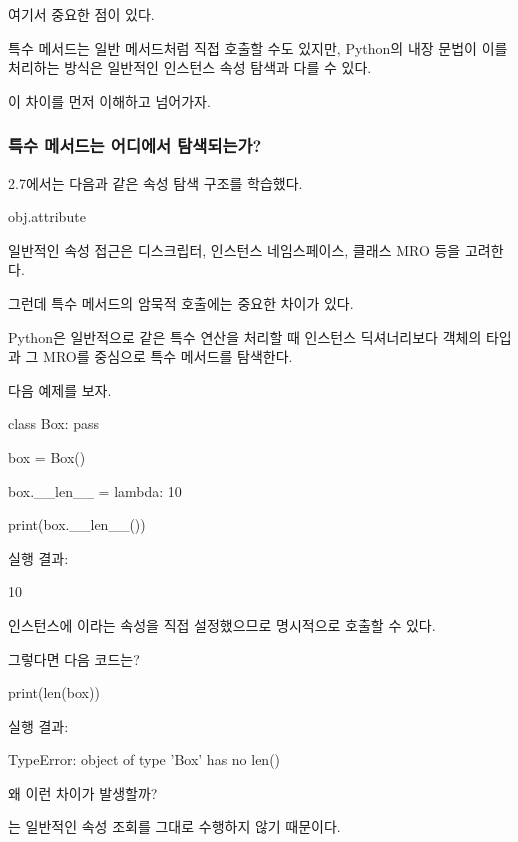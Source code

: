 여기서 중요한 점이 있다.

특수 메서드는 일반 메서드처럼 직접 호출할 수도 있지만, Python의 내장 문법이 이를 처리하는 방식은 일반적인 인스턴스 속성 탐색과 다를 수 있다.

이 차이를 먼저 이해하고 넘어가자.

\subsubsection{특수 메서드는 어디에서 탐색되는가?}

2.7에서는 다음과 같은 속성 탐색 구조를 학습했다.

\begin{dhkcode}
obj.attribute
\end{dhkcode}

일반적인 속성 접근은 디스크립터, 인스턴스 네임스페이스, 클래스 MRO 등을 고려한다.

그런데 특수 메서드의 암묵적 호출에는 중요한 차이가 있다.

Python은 일반적으로  같은 특수 연산을 처리할 때 인스턴스 딕셔너리보다 객체의 타입과 그 MRO를 중심으로 특수 메서드를 탐색한다.

다음 예제를 보자.

\begin{dhkcode}
class Box:
    pass


box = Box()

box.__len__ = lambda: 10

print(box.__len__())
\end{dhkcode}

실행 결과:

\begin{dhkzsh}
10
\end{dhkzsh}

인스턴스에 이라는 속성을 직접 설정했으므로 명시적으로 호출할 수 있다.

그렇다면 다음 코드는?

\begin{dhkcode}
print(len(box))
\end{dhkcode}

실행 결과:

\begin{dhkzsh}
TypeError: object of type 'Box' has no len()
\end{dhkzsh}

왜 이런 차이가 발생할까?

는 일반적인  속성 조회를 그대로 수행하지 않기 때문이다.

